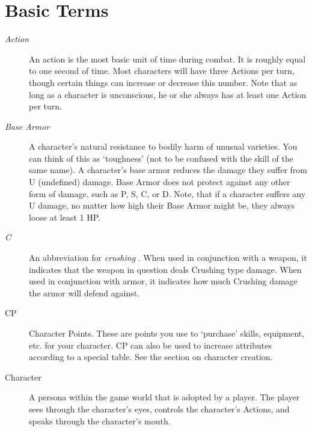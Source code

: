\documentclass[twoside]{book}
\begin{document}
    

\section{Basic Terms}
    
\begin{description}
    
  \item[
                \emph{ Action }
              ]  An action is the most basic unit of time during
                 combat. It is roughly equal to one second of time. Most
                 characters will have three Actions per turn, though
                 certain things can increase or decrease this number.
                 Note that as long as a character is unconscious, he or
                 she always has at least one Action per turn. 
  \item[
                \emph{ Base Armor }
              ]   A character's natural resistance to bodily
                 harm of unusual varieties. You can think of this as
                 `toughness' (not to be confused with the
                 skill of the same name). A character's base armor
                 reduces the damage they suffer from U (undefined)
                 damage. Base Armor does not protect against any other
                 form of damage, such as P, S, C, or D. Note, that if a
                 character suffers any U damage, no matter how high their
                 Base Armor might be, they always loose at least 1 HP.
                 
  \item[
                \emph{ C }
              ]   An abbreviation for 
                 \emph{ crushing } . When used in conjunction
                  with a weapon, it indicates that the weapon in question
                  deals Crushing type damage. When used in conjunction
                  with armor, it indicates how much Crushing damage the
                  armor will defend against.
              
  \item[ CP ]   Character Points. These are points you use to
                 `purchase' skills, equipment, etc. for your
                 character. CP can also be used to increase attributes
                 according to a special table. See the section on
                 character creation. 
  \item[ Character ]   A persona within the game world that is adopted
                 by a player. The player sees through the
                 character's eyes, controls the character's
                 Actions, and speaks through the character's mouth.
                 

\end{description}
\end{document}
